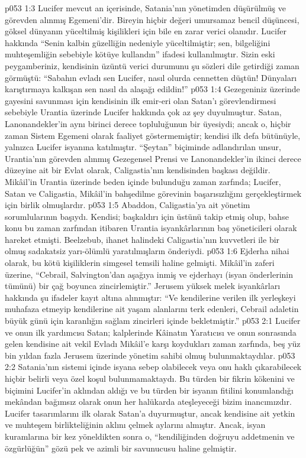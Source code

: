 \vs p053 1:3 Lucifer mevcut an içerisinde, Satania’nın yönetimden düşürülmüş ve görevden alınmış Egemeni’dir. Bireyin hiçbir değeri umursamaz bencil düşüncesi, göksel dünyanın yüceltilmiş kişilikleri için bile en zarar verici olanıdır. Lucifer hakkında “Senin kalbin güzelliğin nedeniyle yüceltilmiştir; sen, bilgeliğini muhteşemliğin sebebiyle kötüye kullandın” ifadesi kullanılmıştır. Sizin eski peygamberiniz, kendisinin üzüntü verici durumunu şu sözleri dile getirdiği zaman görmüştü: “Sabahın evladı sen Lucifer, nasıl olurda cennetten düştün! Dünyaları karıştırmaya kalkışan sen nasıl da alaşağı edildin!”
\vs p053 1:4 Gezegeniniz üzerinde gayesini savunması için kendisinin ilk emir\hyp{}eri olan Satan’ı görevlendirmesi sebebiyle Urantia üzerinde Lucifer hakkında çok az şey duyulmuştur. Satan, Lanonandekler’in aynı birinci derece topluluğunun bir üyesiydi; ancak o, hiçbir zaman Sistem Egemeni olarak faaliyet göstermemiştir; kendisi ilk defa bütünüyle, yalnızca Lucifer isyanına katılmıştır. “Şeytan” biçiminde adlandırılan unsur, Urantia’nın görevden alınmış Gezegensel Prensi ve Lanonandekler’in ikinci derece düzeyine ait bir Evlat olarak, Caligastia’nın kendisinden başkası değildir. Mikâil’in Urantia üzerinde beden içinde bulunduğu zaman zarfında; Lucifer, Satan ve Caligastia, Mikâil’in bahşedilme görevinin başarısızlığını gerçekleştirmek için birlik olmuşlardır.
\vs p053 1:5 Abaddon, Caligastia’ya ait yönetim sorumlularının başıydı. Kendisi; başkaldırı için üstünü takip etmiş olup, bahse konu bu zaman zarfından itibaren Urantia isyankârlarının baş yöneticileri olarak hareket etmişti. Beelzebub, ihanet halindeki Caligastia’nın kuvvetleri ile bir olmuş sadakatsiz yarı\hyp{}ölümlü yaratılmışların önderiydi.
\vs p053 1:6 Ejderha nihai olarak, bu kötü kişiliklerin simgesel temsili haline gelmişti. Mikâil’in zaferi üzerine, “Cebrail, Salvington’dan aşağıya inmiş ve ejderhayı (isyan önderlerinin tümünü) bir çağ boyunca zincirlemiştir.” Jerusem yüksek melek isyankârları hakkında şu ifadeler kayıt altına alınmıştır: “Ve kendilerine verilen ilk yerleşkeyi muhafaza etmeyip kendilerine ait yaşam alanlarını terk edenleri, Cebrail adaletin büyük günü için karanlığın sağlam zincirleri içinde bekletmiştir.”
\vs p053 2:1 Lucifer ve onun ilk yardımcısı Satan; kalplerinde Kâinatın Yaratıcısı ve onun sonrasında gelen kendisine ait vekil Evladı Mikâil’e karşı koydukları zaman zarfında, beş yüz bin yıldan fazla Jerusem üzerinde yönetim sahibi olmuş bulunmaktaydılar.
\vs p053 2:2 Satania’nın sistemi içinde isyana sebep olabilecek veya onu haklı çıkarabilecek hiçbir belirli veya özel koşul bulunmamaktaydı. Bu türden bir fikrin kökenini ve biçimini Lucifer’in aklından aldığı ve bu türden bir isyanın fitilini konumlandığı mekândan bağımsız olarak onun her halükarda ateşleyeceği bizim inancımızdır. Lucifer tasarımlarını ilk olarak Satan’a duyurmuştur, ancak kendisine ait yetkin ve muhteşem birlikteliğinin aklını çelmek aylarını almıştır. Ancak, isyan kuramlarına bir kez yöneldikten sonra o, “kendiliğinden doğruyu addetmenin ve özgürlüğün” gözü pek ve azimli bir savunucusu haline gelmiştir.

